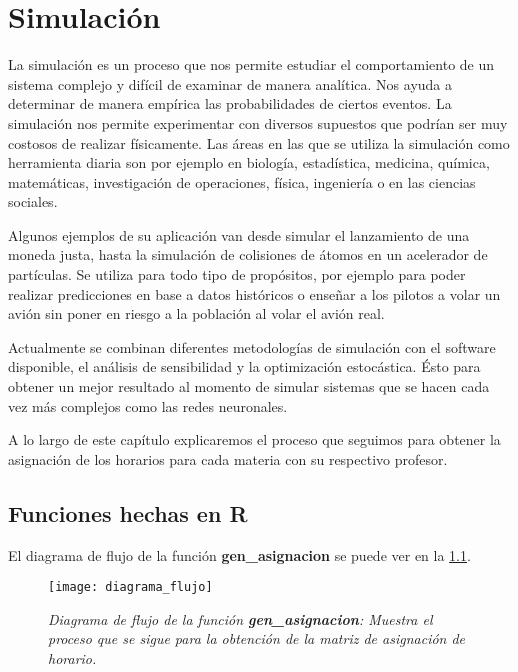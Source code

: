 \chapter{Simulación}

La simulación es un proceso que nos permite estudiar el comportamiento de un sistema complejo y difícil de examinar de manera analítica. Nos ayuda a determinar de manera empírica las probabilidades de ciertos eventos. La simulación nos permite experimentar con diversos supuestos que podrían ser muy costosos de realizar físicamente. Las áreas en las que se utiliza la simulación como herramienta diaria son por ejemplo en biología, estadística, medicina, química, matemáticas, investigación de operaciones, física, ingeniería o en las ciencias sociales.

Algunos ejemplos de su aplicación van desde simular el lanzamiento de una moneda justa, hasta la simulación de colisiones de átomos en un acelerador de partículas. Se utiliza para todo tipo de propósitos, por ejemplo para poder realizar predicciones en base a datos históricos o enseñar a los pilotos a volar un avión sin poner en riesgo a la población al volar el avión real.

Actualmente se combinan diferentes metodologías de simulación con el software disponible, el análisis de sensibilidad y la optimización estocástica. Ésto para obtener un mejor resultado al momento de simular sistemas que se hacen cada vez más complejos como las redes neuronales.

A lo largo de este capítulo explicaremos el proceso que seguimos para obtener la asignación de los horarios para cada materia con su respectivo profesor.

\section{Funciones hechas en R}

El diagrama de flujo de la función \textbf{gen\_asignacion} se puede ver en la \figurename{\ref{DF_genAsig}}.

\begin{figure}[H]
\centering
\texttt{[image: diagrama\_flujo]} %
\caption[\textit{Diagrama de flujo de la función \textbf{gen\_asignacion}}]{\textit{Diagrama de flujo de la función \textbf{gen\_asignacion}: Muestra el proceso que se sigue para la obtención de la matriz de asignación de horario.}}\label{DF_genAsig}
\end{figure}


